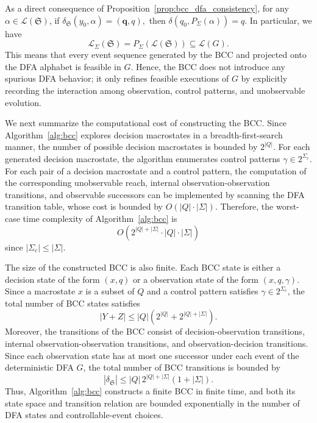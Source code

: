 \documentclass[final,5p,times,twocolumn,authoryear]{elsarticle}
\begin{document}
%
As a direct consequence of Proposition~\ref{prop:bcc_dfa_consistency}, 
for any $\alpha \in \mathcal{L}(\mathfrak{S})$, if
$
\delta_{\mathfrak{S}}(y_0,\alpha)=(\bm{q},q),
$
then
$
    \delta(q_0,P_\Sigma(\alpha)) = q.
$
In particular, we have
$$
    \mathcal{L}_{\Sigma}(\mathfrak{S})
    =
    P_\Sigma(\mathcal{L}(\mathfrak{S}))
    \subseteq
    \mathcal{L}(G).
$$
%
This means that every event sequence generated by the BCC and projected onto the DFA alphabet is feasible in $G$. Hence, the BCC does not introduce any spurious DFA behavior; it only refines feasible executions of $G$ by explicitly recording the interaction among observation, control patterns, and unobservable evolution.

We next summarize the computational cost of constructing the BCC. 
Since Algorithm~\ref{alg:bcc} explores decision macrostates in a breadth-first-search manner, the number of possible decision macrostates is bounded by $2^{|Q|}$. 
For each generated decision macrostate, the algorithm enumerates control patterns $\gamma \in 2^{\Sigma_c}$. 
For each pair of a decision macrostate and a control pattern, the computation of the corresponding unobservable reach, internal observation-observation transitions, and observable successors can be implemented by scanning the DFA transition table, whose cost is bounded by $O(|Q|\cdot |\Sigma|)$. Therefore, the worst-case time complexity of Algorithm~\ref{alg:bcc} is
$$
O(2^{|Q| + |\Sigma|} \cdot |Q| \cdot |\Sigma|)
$$
since $|\Sigma_c|\leq |\Sigma|$.

The size of the constructed BCC is also finite. 
Each BCC state is either a decision state of the form $(x,q)$ or a observation state of the form $(x,q,\gamma)$. Since a macrostate $x$ is a subset of $Q$ and a control pattern satisfies $\gamma\in 2^{\Sigma_c}$, the total number of BCC states satisfies
\begin{equation}
    \label{eq:prop:bcc:1}
    |Y + Z| \leq |Q|(2^{|Q|}+2^{|Q|+|\Sigma|}).    
\end{equation}
Moreover, the transitions of the BCC consist of decision-observation transitions, internal observation-observation transitions, and observation-decision transitions. Since each observation state has at most one successor under each event of the deterministic DFA $G$, the total number of BCC transitions is bounded by
\begin{equation}
    \label{eq:prop:bcc:2}
    |\delta_{\mathfrak{S}}| \leq |Q|\,2^{|Q|+|\Sigma|}(1+|\Sigma|).
\end{equation}
Thus, Algorithm~\ref{alg:bcc} constructs a finite BCC in finite time, and both its state space and transition relation are bounded exponentially in the number of DFA states and controllable-event choices.
\end{document}
